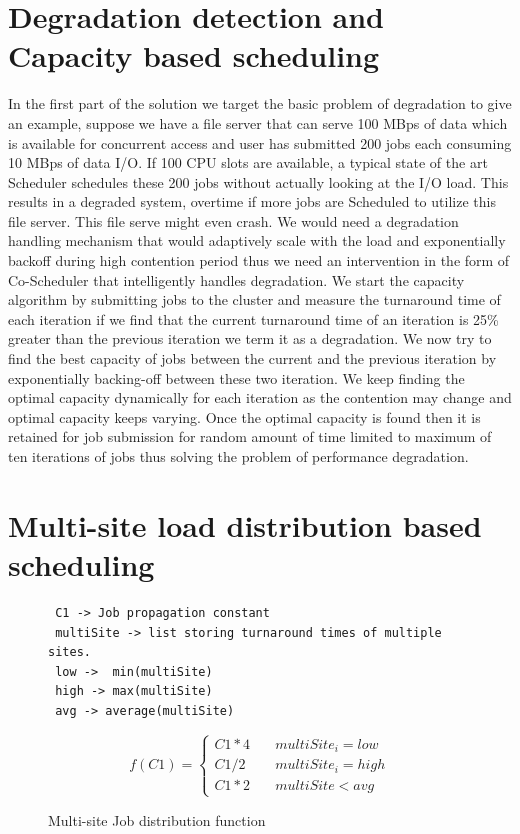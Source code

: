 \documentclass[ms,electronic,double]{nuthesis}
\begin{document}
\section{Degradation detection and Capacity based scheduling}
In the first part of the solution we target the basic problem of degradation to give an example, suppose
we have a file server that can serve 100 MBps of data which is available for concurrent access and user has submitted 200 jobs
each consuming 10 MBps of data I/O. If 100 CPU slots are available, a typical state of the art Scheduler
schedules these 200 jobs without actually looking at the I/O load. This results in a degraded system, 
overtime if more jobs are Scheduled to utilize this file server. This file serve might even crash. We would need a 
degradation handling mechanism that would adaptively scale with the load and  exponentially 
backoff during high contention period thus we need an intervention in the form
of Co-Scheduler that intelligently handles degradation. 
We start the capacity algorithm by submitting jobs to the cluster and measure 
the turnaround time of each iteration if we find that the current turnaround 
time of an iteration is 25\% greater than the previous iteration we term it as a 
degradation. We now try to find the best capacity of jobs between the current 
and the previous iteration by exponentially backing-off between these two iteration. We keep finding the optimal
capacity dynamically for each iteration as the contention may change and optimal capacity keeps 
 varying. Once the optimal capacity is found then it is retained for job submission for random amount of time
 limited to maximum of ten iterations of jobs thus solving the problem of performance degradation. 

\section{Multi-site load distribution based scheduling} 
 \begin{figure}[htbp!]
   
 \begin{verbatim}
 C1 -> Job propagation constant
 multiSite -> list storing turnaround times of multiple sites.
 low ->  min(multiSite)  
 high -> max(multiSite)
 avg -> average(multiSite)
 \end{verbatim}

$$
f(C1) = \left\{
        \begin{array}{ll}
            C1*4 & \quad multiSite_i = low\\ 
            C1/2 & \quad multiSite_i = high \\
            C1*2 & \quad multiSite < avg
        \end{array}
    \right.
$$

\caption{Multi-site Job distribution function}
  \label{fig:multiSite2}

\end{figure}
\end{document}

